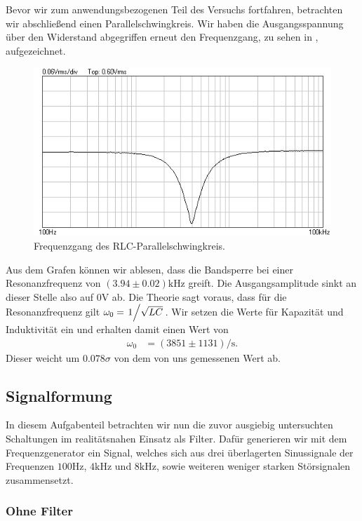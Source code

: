 Bevor wir zum anwendungsbezogenen Teil des Versuchs fortfahren, betrachten wir abschließend einen Parallelschwingkreis. Wir haben die Ausgangsspannung über den Widerstand abgegriffen erneut den Frequenzgang, zu sehen in , aufgezeichnet.


\begin{figure}[H]
  \centering
  \includegraphics[width=.8\textwidth]{files/aufgabe7_parallel_bandsperre.png}
  \caption{Frequenzgang des RLC-Parallelschwingkreis.}
  \label{fig:aufgabe7_parallel_bandsperre}
\end{figure}

Aus dem Grafen können wir ablesen, dass die Bandsperre bei einer Resonanzfrequenz von $(3.94 \pm 0.02)\si{\kilo\hertz}$ greift. Die Ausgangsamplitude sinkt an dieser Stelle also auf $0\si{\volt}$ ab. Die Theorie sagt voraus, dass für die Resonanzfrequenz gilt $\omega_0 = \flatfrac{1}{\sqrt{LC}}$. Wir setzen die Werte für Kapazität und Induktivität ein und erhalten damit einen Wert von
\begin{align}
  \omega_0 &= (3851 \pm 1131) \si{\per\second}.
\end{align}
Dieser weicht um $0.078\sigma$ von dem von uns gemessenen Wert ab.
\newpage
\subsection{Signalformung}

In diesem Aufgabenteil betrachten wir nun die zuvor ausgiebig untersuchten Schaltungen im realitätsnahen Einsatz als Filter. Dafür generieren wir mit dem Frequenzgenerator ein Signal, welches sich aus drei überlagerten Sinussignale der Frequenzen $100\si{\hertz}$, $4\si{\kilo\hertz}$ und $8\si{\kilo\hertz}$, sowie weiteren weniger starken Störsignalen zusammensetzt. 

\subsubsection*{Ohne Filter}

